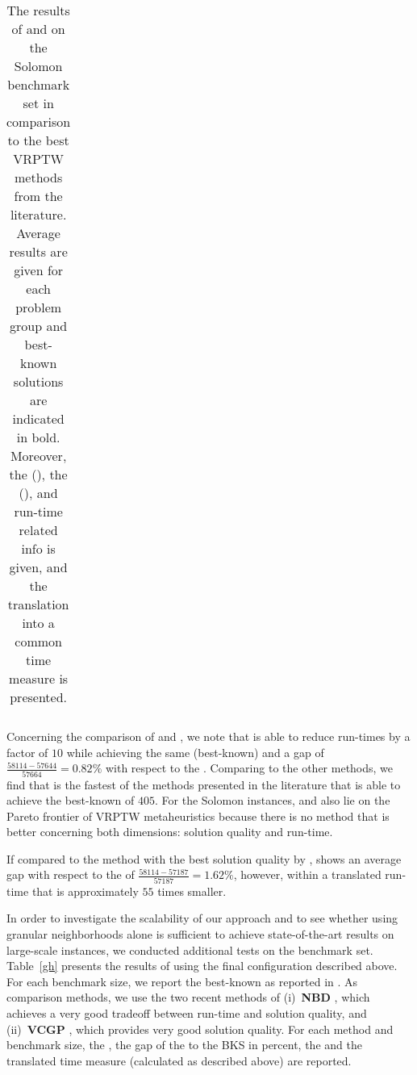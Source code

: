 \documentclass[11pt,a4paper,fleqn]{article}
\begin{document}
\begin{sidewaystable}
\begin{tabular}{@{}lcrcrcrcrcrcrcrcrcrcrcrccrcr@{}}
\bottomrule  
\end{tabular}%
 \caption[Final Results of \tsnew on the Solomon VRPTW benchmark in comparison to the best VRPTW methods.]{The results of  \tsnew and \tscomplete on the Solomon benchmark set in comparison to the best VRPTW methods from the literature. Average results are given for each problem group and best-known solutions are indicated in bold. Moreover, the \cnv (\cnvs), the \ctd (\ctds), and run-time related info is given, and the translation into a common time measure is presented.}
  \label{ds:tab:compareVRPTW}%
\end{sidewaystable}

Concerning the comparison of \tsnew and \tscomplete, we note that \tsnew is able to reduce run-times by a factor of $10$ while achieving the same (best-known) \cnvs and a gap of $\frac{58114-57644}{57664}=0.82\%$ with respect to the \ctds. Comparing to the other methods, we find that \tsnew is the fastest of the methods presented in the literature that is able to achieve the best-known \cnvs of $405$. For the Solomon instances, \tsnew and also \tscomplete lie on the Pareto frontier of VRPTW metaheuristics because there is no method that is better concerning both dimensions: solution quality and run-time. 

If compared to the method with the best solution quality by \citet{nagata:10}, \tsnew shows an average gap with respect to the \ctds of $\frac{58114-57187}{57187}=1.62\%$, however, within a translated run-time that is approximately $55$ times smaller.

In order to investigate the scalability of our approach and to see whether using granular neighborhoods alone is sufficient to achieve state-of-the-art results on large-scale instances, we conducted additional tests on the \citet{gehring:99} benchmark set. Table~\ref{gh} presents the results of \tsnew using the final configuration described above. For each benchmark size, we report the best-known \cnvs as reported in \citet{DesMR14}. As comparison methods, we use the two recent methods of (i)~\textbf{NBD} \citep*{nagata:10}, which achieves a very good tradeoff between run-time and solution quality, and (ii)~\textbf{VCGP} \citep*{vidal:13}, which provides very good solution quality. For each method and benchmark size, the \cnvs, the gap of the \cnvs to the BKS in percent, the \ctds and the translated time measure (calculated as described above) are reported. 
\end{document}
